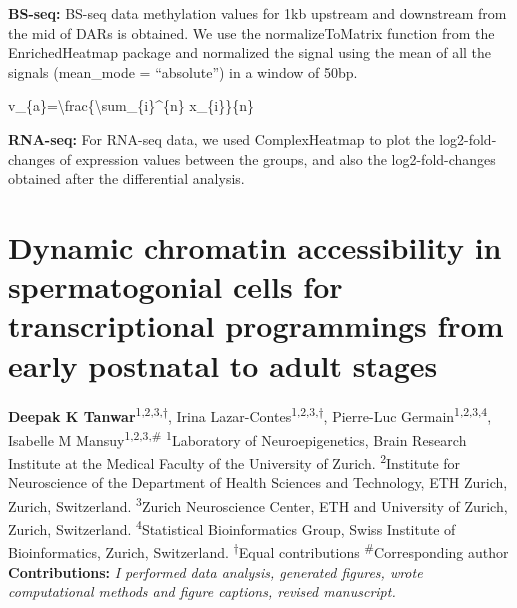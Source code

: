 \documentclass[12pt,twoside]{reedthesis}
\begin{document}
\textbf{BS-seq:} BS-seq data methylation values for 1kb upstream and downstream
from the mid of DARs is obtained. We use the normalizeToMatrix function
from the EnrichedHeatmap package and normalized the signal using the
mean of all the signals (mean\_mode = ``absolute'') in a window of 50bp.

v\_\{a\}=\textbackslash frac\{\textbackslash sum\_\{i\}\^{}\{n\} x\_\{i\}\}\{n\}

\textbf{RNA-seq:} For RNA-seq data, we used ComplexHeatmap to plot the
log2-fold-changes of expression values between the groups, and also the
log2-fold-changes obtained after the differential analysis.

\printbibliography[segment=\therefsegment,heading=subbibliography]

\hypertarget{chapter1}{%
\chapter{Dynamic chromatin accessibility in spermatogonial cells for transcriptional programmings from early postnatal to adult stages}\label{chapter1}}

\textbf{Deepak K Tanwar}\textsuperscript{1,2,3,$\dagger$}, Irina
Lazar-Contes\textsuperscript{1,2,3,$\dagger$}, Pierre-Luc
Germain\textsuperscript{1,2,3,4}, Isabelle M
Mansuy\textsuperscript{1,2,3,\#}\newline \newline
\textsuperscript{1}Laboratory of Neuroepigenetics, Brain Research
Institute at the Medical Faculty of the University of Zurich. \newline
\textsuperscript{2}Institute for Neuroscience of the Department of
Health Sciences and Technology, ETH Zurich, Zurich, Switzerland.\newline
\textsuperscript{3}Zurich Neuroscience Center, ETH and University of
Zurich, Zurich, Switzerland. \newline  \textsuperscript{4}Statistical
Bioinformatics Group, Swiss Institute of Bioinformatics, Zurich,
Switzerland. \newline \newline  \textsuperscript{$\dagger$}Equal
contributions \newline\newline \textsuperscript{\#}Corresponding author
\newline\newline  
\textbf{Contributions:} \emph{I performed data analysis,
generated figures, wrote computational methods and figure captions,
revised manuscript.}
\end{document}
